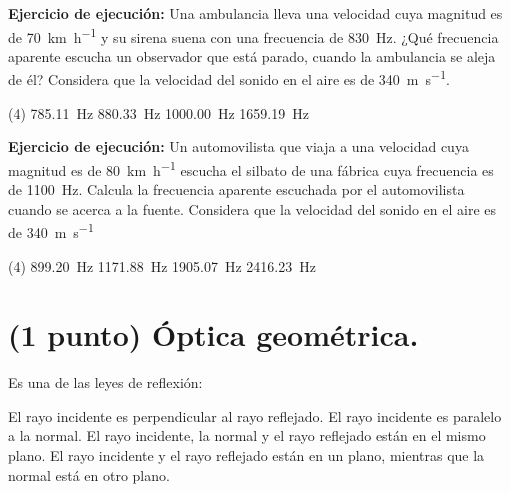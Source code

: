 \documentclass[12pt]{exam}
\begin{document}
\begin{questions}
   \question \label{Ejercicio_04} \textbf{Ejercicio de ejecución: } Una ambulancia lleva una velocidad cuya magnitud es de \SI{70}{\kilo\meter\per\hour} y su sirena suena con una frecuencia de \SI{830}{\hertz}. ¿Qué frecuencia aparente escucha un observador que está parado, cuando la ambulancia se aleja de él? Considera que la velocidad del sonido en el aire es de \SI{340}{\meter\per\second}.
   \begin{tasks}(4)
    \task \SI{785.11}{\hertz}
    \task \SI{880.33}{\hertz}
    \task \SI{1000.00}{\hertz}
    \task \SI{1659.19}{\hertz}
    \end{tasks}
    \question \label{Ejercicio_05} \textbf{Ejercicio de ejecución: } Un automovilista que viaja a una velocidad cuya magnitud es de \SI{80}{\kilo\meter\per\hour} escucha el silbato de una fábrica cuya frecuencia es de \SI{1100}{\hertz}. Calcula la frecuencia aparente escuchada por el automovilista cuando se acerca a la fuente. Considera que la velocidad del sonido en el aire es de \SI{340}{\meter\per\second}
    \begin{tasks}(4)
        \task \SI{899.20}{\hertz}
        \task \SI{1171.88}{\hertz}
        \task \SI{1905.07}{\hertz}
        \task \SI{2416.23}{\hertz}
    \end{tasks}

    \section{(1 punto) Óptica geométrica.}

    \question Es una de las leyes de reflexión:
    \begin{tasks}
        \task El rayo incidente es perpendicular al rayo reflejado.
        \task El rayo incidente es paralelo a la normal.
        \task El rayo incidente, la normal y el rayo reflejado están en el mismo plano.
        \task El rayo incidente y el rayo reflejado están en un plano, mientras que la normal está en otro plano.
    \end{tasks}


\end{questions}
\end{document}
